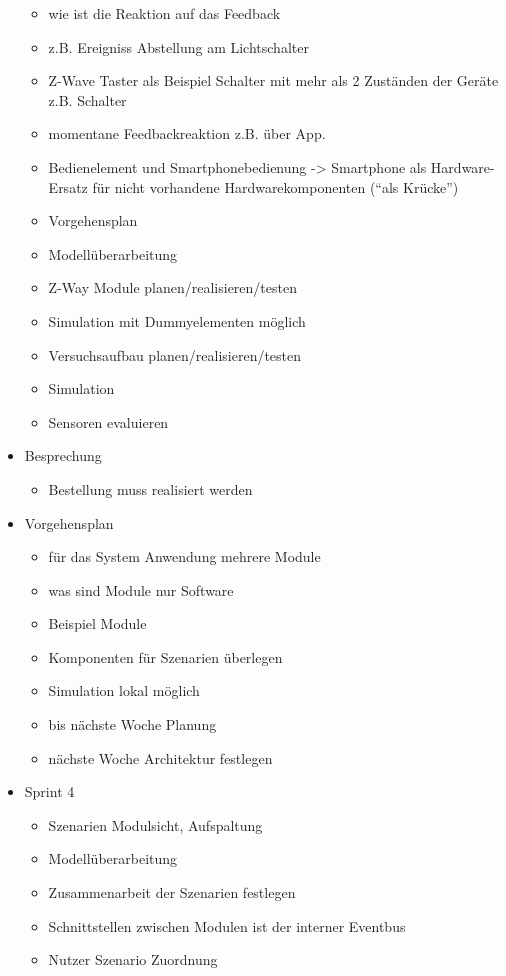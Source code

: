 \begin{itemize}
\begin{itemize}
		\item wie ist die Reaktion auf das Feedback
		\item z.B. Ereigniss Abstellung am Lichtschalter
		\item Z-Wave Taster als Beispiel Schalter mit mehr als 2 Zuständen der Geräte z.B. Schalter
		\item momentane Feedbackreaktion z.B. über App.
		\item Bedienelement und Smartphonebedienung -> Smartphone als Hardware-Ersatz für nicht vorhandene Hardwarekomponenten ("`als Krücke"')
		\item Vorgehensplan
		\item Modellüberarbeitung
		\item Z-Way Module planen/realisieren/testen
		\item Simulation mit Dummyelementen möglich
		\item Versuchsaufbau planen/realisieren/testen
		\item Simulation
		\item Sensoren evaluieren
	\end{itemize}
	\item Besprechung
	\begin{itemize}
		\item Bestellung muss realisiert werden
	\end{itemize}
	\item Vorgehensplan
	\begin{itemize}
		\item für das System Anwendung mehrere Module
		\item was sind Module \textrightarrow nur Software
		\item Beispiel Module
		\item Komponenten für Szenarien überlegen
		\item Simulation lokal möglich
		\item bis nächste Woche Planung
		\item nächste Woche Architektur festlegen
	\end{itemize}
	\item Sprint 4
	\begin{itemize}
		\item Szenarien Modulsicht, Aufspaltung
		\item Modellüberarbeitung
		\item Zusammenarbeit der Szenarien festlegen
		\item Schnittstellen zwischen Modulen ist der interner Eventbus
		\item Nutzer Szenario Zuordnung

\end{itemize}
\end{itemize}
